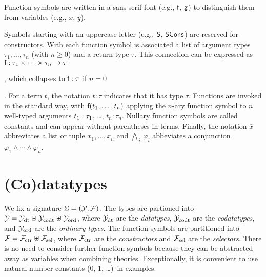 \begin{report}
Function symbols are written in a sans-serif font (e.g., $\textsf{f}$, $\textsf{g}$) to
distinguish them from variables (e.g., $x$, $y$).
\end{report}
Symbols starting with an uppercase letter (e.g.,
$\textsf{S}$, $\textsf{SCons}$) are reserved for constructors. With each function symbol 
is associated a list of argument types $\tau_1,\ldots,\tau_n$ (with $n \ge 0$)
and a return type $\tau$. This connection can be expressed %
as $\textsf{f} : \tau_1 \times \cdots \times \tau_n \to \tau$\begin{report},
which collapses to $\textsf{f} : \tau$ if $n = 0$\end{report}.
For a term $t$, the notation $t : \tau$ indicates that it has type $\tau$.
Functions are invoked in the standard way, with $\textsf{f}(t_1,\ldots,t_n)$
applying the $n$-ary function symbol
 to $n$ well-typed arguments $t_1 :\nobreak \tau_1$, \ldots, $t_n :
\tau_n$. Nullary function symbols are called constants and can appear without
parentheses in terms.
%
Finally, the notation $\bar x$ abbreviates a list or tuple $x_1,\ldots,x_n$
and $\bigwedge_{\,i}\, \varphi_i$ abbeviates a conjunction
$\varphi_1 \mathrel\land \cdots \mathrel\land \varphi_n$.


\section{%
(Co)datatypes}
\label{sec:the-theory-of-co-datatypes}


We fix a signature $\mathrm{\Sigma} = (\mathcal{Y}, \mathcal{F})$. The types are partioned into
$\mathcal{Y} = \mathcal{Y}_{\mathrm{dt}} \mathrel{\uplus} \mathcal{Y}_{\mathrm{codt}} \mathrel{\uplus} \mathcal{Y}_{\mathrm{ord}}$, where $\mathcal{Y}_{\mathrm{dt}}$ are the
\emph{datatypes}, $\mathcal{Y}_{\mathrm{codt}}$ are the \emph{codatatypes}, and $\mathcal{Y}_{\mathrm{ord}}$ are the %
\emph{ordinary types}. The function symbols are partitioned into $\mathcal{F} = \mathcal{F}_{\mathrm{ctr}}
\mathrel{\uplus} \mathcal{F}_{\mathrm{sel}}$, where $\mathcal{F}_{\mathrm{ctr}}$ are the \emph{constructors} and $\mathcal{F}_{\mathrm{sel}}$ are the
\emph{selectors}. There is no need to consider further function symbols
because they can be abstracted away as variables when combining theories.
Exceptionally, it is convenient to use natural number
constants ($0$, $1$, \ldots)\ in examples.

